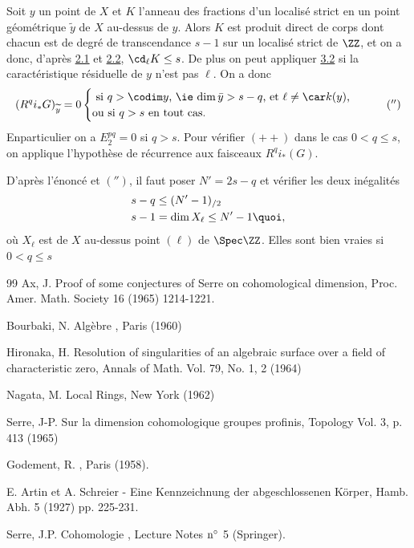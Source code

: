 \documentclass[10pt]{../fichiers-configuration-latex/smfart}
\begin{document}
Soit $y$ un point de $X$ et $K$ l'anneau des fractions d'un localisé
strict en un point géométrique $\widetilde{y}$ de $X$ au-dessus de
$y$. Alors $K$ est produit direct de corps dont chacun est de degré de
transcendance $s-1$ sur un localisé strict de $\ZZ$, et on a
donc, d'après \hyperref[X.thm2.1]{2.1} et \hyperref[X.thm2.2]{2.2}, $\cd_{\ell}K\leq s$. De plus on peut
appliquer \hyperref[X.prop3.2]{3.2} si la caractéristique résiduelle de $y$ n'est pas
$\ell$. On a donc
\begin{equation*}
(R^qi_{\ast}G)_{\widetilde{y}}=0
\begin{cases}
\mbox{ si $q>\codim y$, \ie $\dim \bar{y}>s-q$, et $\ell\neq \car
k(y)$,}\\
\mbox{ou si $q>s$ en tout cas.}
\end{cases}
\tag{$''$}
\end{equation*}
En\pageoriginale particulier on a $E^{pq}_2=0$ si $q>s$. Pour vérifier
$({+}{+})$ dans le cas $0<q\leq s$, on applique l'hypothèse de
récurrence aux faisceaux $R^qi_{\ast}(G)$.

D'après l'énoncé et $('')$, il faut poser $N'=2s-q$ et vérifier les
deux inégalités
\begin{align*}
& s-q\leq (N'-1)_{/2}\\
& s-1=\dim X_{\ell}\leq N'-1{\quoi},
\end{align*}
où $X_{\ell}$ est  de $X$ au-dessus  point $(\ell)$ de
$\Spec \ZZ$. Elles sont bien vraies si $0<q\leq s$ \cqfd

\begin{thebibliography}{99}
Ax, J.  Proof of some conjectures of Serre on
cohomological dimension, Proc. Amer. Math. Society 16 (1965)
1214-1221.

 Bourbaki, N. Algèbre , Paris (1960)

Hironaka, H.  Resolution of singularities of an algebraic surface
over a field of characteristic zero, Annals of Math. Vol. 79, No. 1, 2
(1964)

 
 Nagata, M. Local Rings, New York (1962)

Serre, J-P.  Sur la dimension cohomologique  groupes profinis,
Topology Vol. 3, p. 413 (1965)


 Godement, R. , Paris (1958).

E. Artin et A.  Schreier - Eine Kennzeichnung der 
abgeschlossenen Körper, Hamb. Abh. 5 (1927) pp. 225-231.


 Serre, J.P. Cohomologie , Lecture Notes
${\rm n^{\circ}}$ 5 (Springer).
\end{thebibliography}

\ifx\danslelivre\undefined
\end{document}

